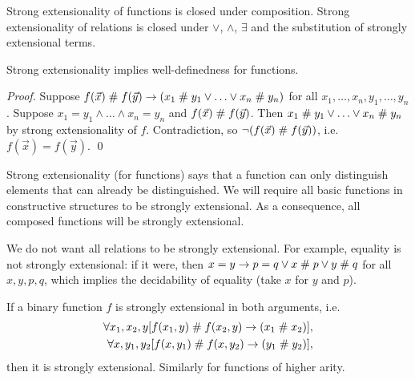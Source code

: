 \begin{fact}
Strong extensionality of functions is closed under composition. Strong
extensionality of relations is closed under $\vee$, $\wedge$,
$\exists$ and the substitution of strongly extensional terms.
\end{fact}

\begin{lemma}
Strong extensionality implies well-definedness for functions.
\end{lemma}

\begin{proof}
Suppose $f(\vec{x}) \mathrel{\#} f(\vec{y}) \rightarrow (x_1\mathrel{\#} y_1 \vee
\ldots \vee x_n \mathrel{\#} y_n)$ for all $x_1, \ldots, x_n, y_1, \ldots,
y_n$. Suppose $x_1 = y_1\wedge \ldots \wedge x_n = y_n$ and
$f(\vec{x}) \mathrel{\#} f(\vec{y})$. Then $x_1\mathrel{\#} y_1 \vee \ldots \vee x_n
\mathrel{\#} y_n$ by strong extensionality of $f$. Contradiction, so
$\neg(f(\vec{x}) \mathrel{\#} f(\vec{y}))$, i.e.\ $f(\vec{x}) = f(\vec{y})$.
\qed
\end{proof}

 
\begin{remark}
Strong extensionality (for functions) says that a function can only
distinguish elements that can already be distinguished.  We will
require all basic functions in constructive structures to be strongly
extensional.  As a consequence, all composed functions will be
strongly extensional.
%

We do not want all relations to be strongly extensional. For example,
equality is not strongly extensional: if it were, then $x = y \rightarrow
p=q\vee x\mathrel{\#} p\vee y\mathrel{\#} q$ for all $x,y,p,q$, which implies the
decidability of equality (take $x$ for $y$ and $p$).
\end{remark}

\begin{lemma}\label{lemstrextarg}
If a binary function $f$ is strongly extensional in both arguments,
i.e.\
\begin{eqnarray*}
\forall x_1, x_2, y [f(x_1,y) \mathrel{\#} f(x_2, y) \rightarrow (x_1\mathrel{\#}
x_2)],\\
\forall x, y_1,y_2 [f(x,y_1) \mathrel{\#} f(x, y_2) \rightarrow (y_1\mathrel{\#} y_2)],
\end{eqnarray*}
then it is strongly extensional. Similarly for functions of higher
arity.
\end{lemma}

